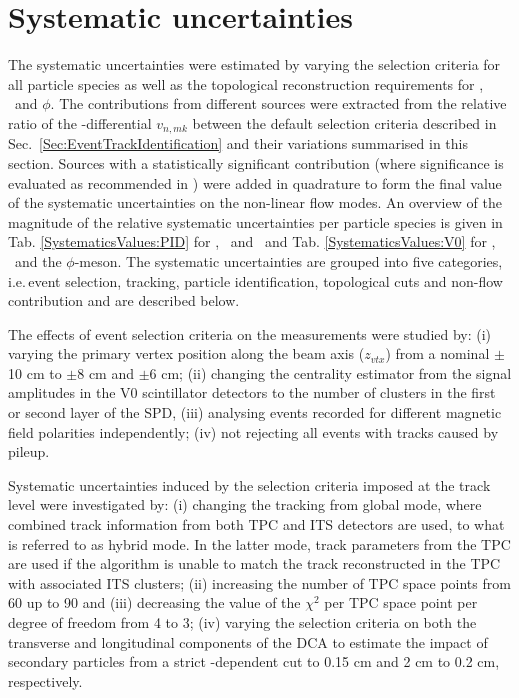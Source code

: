 \section{Systematic uncertainties}
\label{Sec:Systematics}

The systematic uncertainties were estimated by varying the selection criteria for all particle species as well as the topological reconstruction requirements for \Ks, \lambdas~and $\phi$. The contributions from different sources were extracted from the relative ratio of the \pT-differential $v_{n,mk}$ between the default selection criteria described in Sec.~\ref{Sec:EventTrackIdentification} and their variations summarised in this section. Sources with a statistically significant contribution (where significance is evaluated as recommended in \cite{Barlow:2002yb}) were added in quadrature to form the final value of the systematic uncertainties on the non-linear flow modes. 
An overview of the magnitude of the relative systematic uncertainties per particle species is given in Tab. \ref{SystematicsValues:PID} for \pion, \kaon~and \proton~and Tab. \ref{SystematicsValues:V0} for \Ks, \lambdas~and the $\phi$-meson. The systematic uncertainties are grouped into five categories, i.e.\,event selection, tracking, particle identification, topological cuts and non-flow contribution and are described below.

The effects of event selection criteria on the measurements were studied by:  (i) varying the primary vertex position along the beam axis ($z_{vtx}$) from a nominal $\pm$10 cm to $\pm$8 cm and $\pm$6 cm; (ii) changing the centrality estimator from the signal amplitudes in the V0 scintillator detectors to the number of clusters in the first or second layer of the SPD, (iii) analysing events recorded for different magnetic field polarities independently; (iv) not rejecting all events with tracks caused by pileup. 

Systematic uncertainties induced by the selection criteria imposed at the track level were investigated by: (i) changing the tracking from global mode, where combined track information from both TPC and ITS detectors are used, to what is referred to as hybrid mode. In the latter mode, track parameters from the TPC are used if the algorithm is unable to match the track reconstructed in the TPC with associated ITS clusters; (ii) increasing the number of TPC space points from 60 up to 90 and (iii) decreasing the value of the $\chi^{2}$ per TPC space point per degree of freedom from 4 to 3; (iv) varying the selection criteria on both the transverse and longitudinal components of the DCA to estimate the impact of secondary particles from a strict \pT-dependent cut to 0.15 cm and 2 cm to 0.2 cm, respectively.

